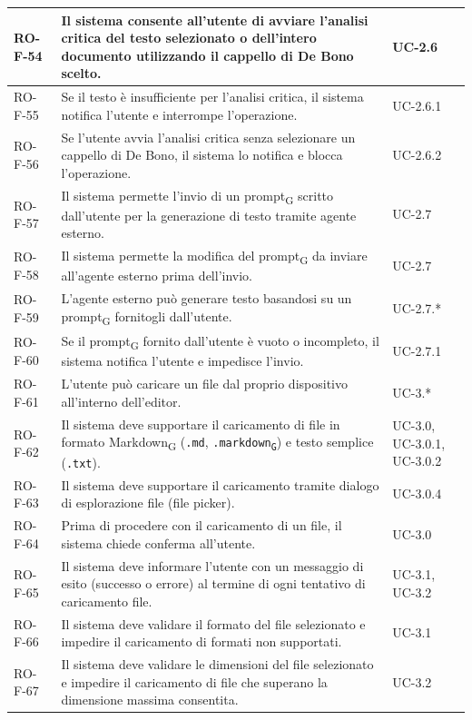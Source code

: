 \documentclass[11pt,a4paper]{article}
\newcommand{\gls}[1]{#1\textsubscript{G}}
\begin{document}
\begin{longtable}{|p{}|>{\raggedright\arraybackslash}p{}|p{}|}
\hline
RO-F-54 & Il sistema consente all'utente di avviare l'analisi critica del testo selezionato o dell'intero documento utilizzando il cappello di De Bono scelto. & UC-2.6 \\
\hline
RO-F-55 & Se il testo è insufficiente per l'analisi critica, il sistema notifica l'utente e interrompe l'operazione. & UC-2.6.1 \\
\hline
RO-F-56 & Se l'utente avvia l'analisi critica senza selezionare un cappello di De Bono, il sistema lo notifica e blocca l'operazione. & UC-2.6.2 \\
\hline
RO-F-57 & Il sistema permette l'invio di un \gls{prompt} scritto dall'utente per la generazione di testo tramite agente esterno. & UC-2.7 \\
\hline
RO-F-58 & Il sistema permette la modifica del \gls{prompt} da inviare all'agente esterno prima dell'invio. & UC-2.7 \\
\hline
RO-F-59 & L'agente esterno può generare testo basandosi su un \gls{prompt} fornitogli dall'utente. & UC-2.7.* \\
\hline
RO-F-60 & Se il \gls{prompt} fornito dall'utente è vuoto o incompleto, il sistema notifica l'utente e impedisce l'invio. & UC-2.7.1 \\
\hline
RO-F-61 & L'utente può caricare un file dal proprio dispositivo all'interno dell'editor. & UC-3.* \\
\hline
RO-F-62 & Il sistema deve supportare il caricamento di file in formato \gls{Markdown} (\texttt{.md}, \texttt{.\gls{markdown}}) e testo semplice (\texttt{.txt}). & UC-3.0, UC-3.0.1, UC-3.0.2 \\
\hline
RO-F-63 & Il sistema deve supportare il caricamento tramite dialogo di esplorazione file (file picker). & UC-3.0.4 \\
\hline
RO-F-64 & Prima di procedere con il caricamento di un file, il sistema chiede conferma all'utente. & UC-3.0 \\
\hline
RO-F-65 & Il sistema deve informare l'utente con un messaggio di esito (successo o errore) al termine di ogni tentativo di caricamento file. & UC-3.1, UC-3.2 \\
\hline
RO-F-66 & Il sistema deve validare il formato del file selezionato e impedire il caricamento di formati non supportati. & UC-3.1 \\
\hline
RO-F-67 & Il sistema deve validare le dimensioni del file selezionato e impedire il caricamento di file che superano la dimensione massima consentita. & UC-3.2 \\
\hline

\end{longtable}
\end{document}
